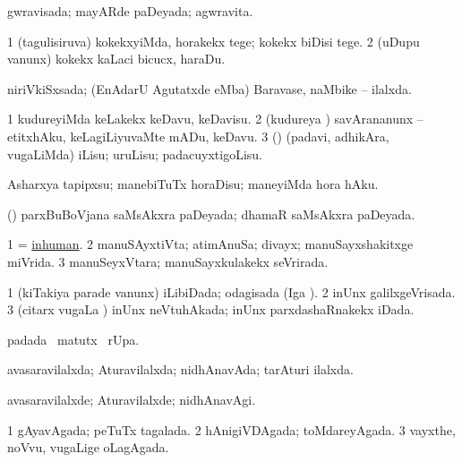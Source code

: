 \bentry
{} 
\gl{\gu}
\expl{}
\bmng
gwravisada; mayARde paDeyada; agwravita. 
\emng
\eentry

\bentry
{} 
\gl{\sakirx}
\expl{}
\bmng
\bnum
\num{1} (tagulisiruva) kokekxyiMda, horakekx tege; kokekx biDisi tege. 
\num{2} (uDupu \mo vanunx) kokekx kaLaci bicucx, haraDu. 
\enum
\emng
\eentry

\bentry
{} 
\gl{\gu}
\expl{}
\bmng
niriVkiSxsada; (EnAdarU Agutatxde eMba) Baravase, naMbike -- ilalxda. 
\emng
\eentry

\bentry
{} 
\gl{\sakirx}
\expl{}
\bmng
\bnum
\num{1} kudureyiMda keLakekx keDavu, keDavisu. 
\num{2} (kudureya \vi) savArananunx -- etitxhAku, keLagiLiyuvaMte mADu, keDavu. 
\num{3} (\rUpa) (padavi, adhikAra, \mo vugaLiMda) iLisu; uruLisu; padacuyxtigoLisu. 
\enum
\emng
\eentry

\bentry
{} 
\gl{\akirx}
\expl{}
\bmng
Asharxya tapipxsu; manebiTuTx horaDisu; maneyiMda hora hAku. 
\emng
\eentry

\bentry
{} 
\gl{\gu}
\expl{}
\bmng
(\kerxY) parxBuBoVjana saMsAkxra paDeyada; dhamaR saMsAkxra paDeyada. 
\emng
\eentry

\bentry
{} 
\gl{\gu}
\expl{}
\bmng
\bnum
\num{1} = \hyperref{kandict_i.pdf}{I}{inhuman}{inhuman}. 
\num{2} manuSAyxtiVta; atimAnuSa; divayx; manuSayxshakitxge miVrida. 
\num{3} manuSeyxVtara; manuSayxkulakekx seVrirada. 
\enum
\emng
\eentry

\bentry
{} 
\gl{\gu}
\expl{}
\bmng
\bnum
\num{1} (kiTakiya parade \mo vanunx) iLibiDada; odagisada (Iga \viparx). 
\num{2} inUnx galilxgeVrisada. 
\num{3} (citarx \mo vugaLa \vi) inUnx neVtuhAkada; inUnx parxdashaRnakekx iDada. 
\enum
\emng
\eentry

\bentry
{} 
\gl{\kirx}
\expl{}
\bmng
{} padada \BU\ matutx \BUkaq\ rUpa. 
\emng
\eentry

\bentry
{} 
\gl{\gu}
\expl{}
\bmng
avasaravilalxda; Aturavilalxda; nidhAnavAda; tarAturi ilalxda. 
\emng
\eentry

\bentry
{} 
\gl{\kirxvi}
\expl{}
\bmng
avasaravilalxde; Aturavilalxde; nidhAnavAgi. 
\emng
\eentry

\bentry
{} 
\gl{\gu}
\bmng
\bnum
\num{1} gAyavAgada; peTuTx tagalada. 
\num{2} hAnigiVDAgada; toMdareyAgada. 
\num{3} vayxthe, noVvu, \mo vugaLige oLagAgada. 
\enum
\emng
\eentry

